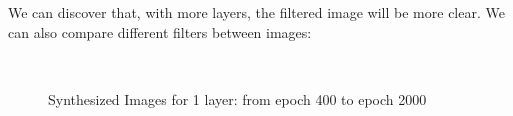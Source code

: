 \documentclass[11pt]{article}
\begin{document}
We can discover that, with more layers, the filtered image will be more clear.
We can also compare different filters between images:
\begin{figure}[h]
	\centering
	\setlength{\fboxrule}{1pt}
	\setlength{\fboxsep}{0cm}	
	\\[3px]
	\caption{Synthesized Images for 1 layer: from epoch 400 to epoch 2000}
\end{figure}
\end{document}

